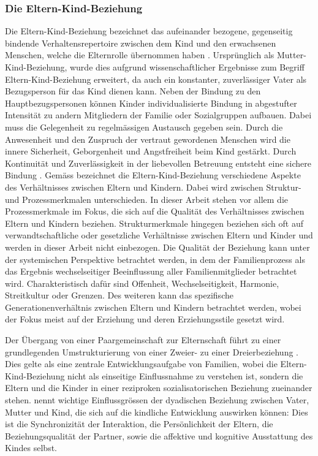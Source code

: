 \subsubsection{Die Eltern-Kind-Beziehung}\label{sec:ElternKindBeziehung}
Die Eltern-Kind-Beziehung bezeichnet das aufeinander bezogene, gegenseitig bindende Verhaltensrepertoire zwischen dem Kind und den erwachsenen Menschen, welche die Elternrolle übernommen haben \cite{ElternKindBeziehung1999}. Ursprünglich als Mutter-Kind-Beziehung, wurde dies aufgrund wissenschaftlicher Ergebnisse zum Begriff Eltern-Kind-Beziehung erweitert, da auch ein konstanter, zuverlässiger Vater als Bezugsperson für das Kind dienen kann. Neben der Bindung zu den Hauptbezugspersonen können Kinder individualisierte Bindung in abgestufter Intensität zu andern Mitgliedern der Familie oder Sozialgruppen aufbauen. Dabei muss die Gelegenheit zu regelmässigen Austausch gegeben sein. Durch die Anwesenheit und den Zuspruch der vertraut gewordenen Menschen wird die innere Sicherheit, Geborgenheit und Angstfreiheit beim Kind gestärkt. Durch Kontinuität und Zuverlässigkeit in der liebevollen Betreuung entsteht eine sichere Bindung \cite{ElternKindBeziehung1999}. Gemäss  bezeichnet die Eltern-Kind-Beziehung verschiedene Aspekte des Verhältnisses zwischen Eltern und Kindern. Dabei wird zwischen Struktur- und Prozessmerkmalen unterschieden. In dieser Arbeit stehen vor allem die Prozessmerkmale im Fokus, die sich auf die Qualität des Verhältnisses zwischen Eltern und Kindern beziehen. Strukturmerkmale hingegen beziehen sich oft auf verwandtschaftliche oder gesetzliche Verhältnisse zwischen Eltern und Kinder und werden in dieser Arbeit nicht einbezogen. Die Qualität der Beziehung kann unter der systemischen Perspektive betrachtet werden, in dem der Familienprozess als das Ergebnis wechselseitiger Beeinflussung aller Familienmitglieder betrachtet wird. Charakteristisch dafür sind Offenheit, Wechselseitigkeit, Harmonie, Streitkultur oder Grenzen. Des weiteren kann das spezifische Generationenverhältnis zwischen Eltern und Kindern betrachtet werden, wobei der Fokus meist auf der Erziehung und deren Erziehungsstile gesetzt wird. 

Der Übergang von einer Paargemeinschaft zur Elternschaft führt zu einer grundlegenden Umstrukturierung von einer Zweier- zu einer Dreierbeziehung \cite{Hofer1992, Buergin1998}. Dies gelte als eine zentrale Entwicklungsaufgabe von Familien, wobei die Eltern-Kind-Beziehung nicht als einseitige Einflussnahme zu verstehen ist, sondern die Eltern und die Kinder in einer reziproken sozialisatorischen Beziehung zueinander stehen.  nennt wichtige Einflussgrössen der dyadischen Beziehung zwischen Vater, Mutter und Kind, die sich auf die kindliche Entwicklung auswirken können: Dies ist die Synchronizität der Interaktion, die Persönlichkeit der Eltern, die Beziehungsqualität der Partner, sowie die affektive und kognitive Ausstattung des Kindes selbst. 

